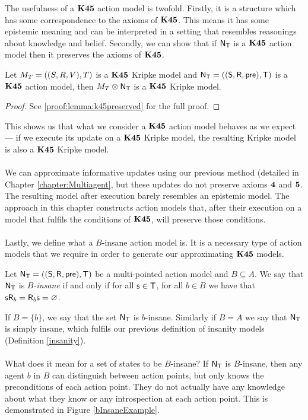 The usefulness of a $\bf K45$ action model is twofold.
Firstly, it is a structure which has some correspondence to the axioms of $\bf K45$.
This means it has some epistemic meaning and can be interpreted in a setting that resembles
reasonings about knowledge and belief.
Secondly, we can show that if $\mathrm{\mathsf{N}}_\mathrm{\mathsf{T}}$ is a $\bf K45$ action model then it preserves the axioms of
$\bf K45$.

\begin{lemma} \label{lemma:k45preserved}
	Let $M_T = ((S,R,V),T)$ is a $\bf K45$ Kripke model and $\mathrm{\mathsf{N}}_\mathrm{\mathsf{T}} = ((\mathrm{\mathsf{S}},\mathrm{\mathsf{R}},\mathrm{\mathsf{pre}}),\mathrm{\mathsf{T}})$ is a $\bf K45$ action model, then
	$M_T \otimes \mathrm{\mathsf{N}}_\mathrm{\mathsf{T}}$ is a $\bf K45$ Kripke model.
\end{lemma}
\begin{proof}
	See \ref{proof:lemma:k45preserved} for the full proof.
\end{proof}

This shows us that what we consider a $\bf K45$ action model behaves as we expect --- if we execute
its update on a $\bf K45$ Kripke model, the resulting Kripke model is also a $\bf K45$ Kripke model.\\
\\
We can approximate informative updates using our previous method (detailed in Chapter
\ref{chapter:Multiagent}, but these updates do not preserve
axioms $\bf 4$ and $\bf 5$.
The resulting model after execution barely resembles an epistemic model.
The approach in this chapter constructs action models that, after their execution on a model that
fulfils the conditions of $\bf K45$, will preserve those conditions.\\
\\
Lastly, we define what a $B$-insane action model is.
It is a necessary type of action models that we require in order to generate our approximating $\bf K45$ models.

\begin{defn} \label{binsane}
	Let $\mathrm{\mathsf{N}}_\mathrm{\mathsf{T}} = ((\mathrm{\mathsf{S}}, \mathrm{\mathsf{R}}, \mathrm{\mathsf{pre}}), \mathrm{\mathsf{T}})$ be a multi-pointed action model and $B \subseteq A$.
	We say that $\mathrm{\mathsf{N}}_\mathrm{\mathsf{T}}$ is {\em $B$-insane} if and only if for all $\mathrm{\mathsf{s}} \in \mathrm{\mathsf{T}}$,
	for all $b \in B$ we have that $\mathrm{\mathsf{s}} \mathrm{\mathsf{R}}_b = \mathrm{\mathsf{R}}_b \mathrm{\mathsf{s}} = \varnothing$.
\end{defn}

If $B = \{b\}$, we say that the set $\mathrm{\mathsf{N}}_\mathrm{\mathsf{T}}$ is $b$-insane.
Similarly if $B = A$ we say that $\mathrm{\mathsf{N}}_\mathrm{\mathsf{T}}$ is simply insane, which fulfils
our previous definition of insanity models (Definition \ref{insanity}).\\
\\
What does it mean for a set of states to be $B$-insane?
If $\mathrm{\mathsf{N}}_\mathrm{\mathsf{T}}$ is $B$-insane, then any agent $b$ in $B$ can distinguish between
action points, but only knows the preconditions of each action point.
They do not actually have any knowledge about what they know or any
introspection at each action point.
This is demonstrated in Figure \ref{bInsaneExample}.

